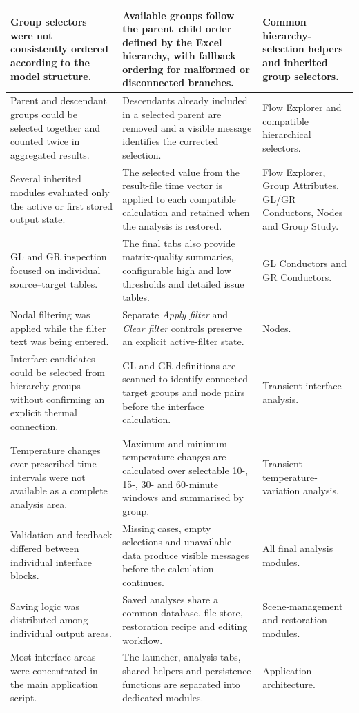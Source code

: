 \begin{longtable}{|>{\raggedright\arraybackslash}p{}|>{\raggedright\arraybackslash}p{}|>{\raggedright\arraybackslash}p{}|}
    Group selectors were not consistently ordered according to the model
    structure. &
    Available groups follow the parent--child order defined by the Excel
    hierarchy, with fallback ordering for malformed or disconnected branches. &
    Common hierarchy-selection helpers and inherited group selectors. \\
    \hline
    Parent and descendant groups could be selected together and counted twice
    in aggregated results. &
    Descendants already included in a selected parent are removed and a visible
    message identifies the corrected selection. &
    Flow Explorer and compatible hierarchical selectors. \\
    \hline
    Several inherited modules evaluated only the active or first stored output
    state. &
    The selected value from the result-file time vector is applied to each
    compatible calculation and retained when the analysis is restored. &
    Flow Explorer, Group Attributes, GL/GR Conductors, Nodes and Group Study. \\
    \hline
    GL and GR inspection focused on individual source--target tables. &
    The final tabs also provide matrix-quality summaries, configurable high and
    low thresholds and detailed issue tables. &
    GL Conductors and GR Conductors. \\
    \hline
    Nodal filtering was applied while the filter text was being entered. &
    Separate \textit{Apply filter} and \textit{Clear filter} controls preserve
    an explicit active-filter state. &
    Nodes. \\
    \hline
    Interface candidates could be selected from hierarchy groups without
    confirming an explicit thermal connection. &
    GL and GR definitions are scanned to identify connected target groups and
    node pairs before the interface calculation. &
    Transient interface analysis. \\
    \hline
    Temperature changes over prescribed time intervals were not available as a
    complete analysis area. &
    Maximum and minimum temperature changes are calculated over selectable
    10-, 15-, 30- and 60-minute windows and summarised by group. &
    Transient temperature-variation analysis. \\
    \hline
    Validation and feedback differed between individual interface blocks. &
    Missing cases, empty selections and unavailable data produce visible
    messages before the calculation continues. &
    All final analysis modules. \\
    \hline
    Saving logic was distributed among individual output areas. &
    Saved analyses share a common database, file store, restoration recipe and
    editing workflow. &
    Scene-management and restoration modules. \\
    \hline
    Most interface areas were concentrated in the main application script. &
    The launcher, analysis tabs, shared helpers and persistence functions are
    separated into dedicated modules. &
    Application architecture. \\
    \hline
\end{longtable}
\endgroup
